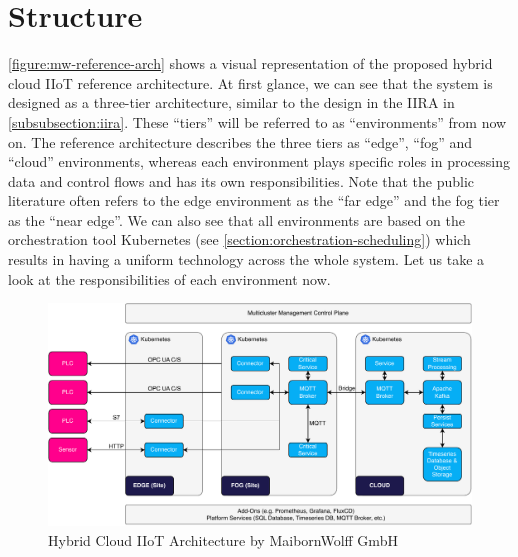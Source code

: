 \section{Structure}
\label{section:hybrid-cloud-structure}

    \autoref{figure:mw-reference-arch} shows a visual representation of the proposed hybrid cloud IIoT reference architecture. At first glance, we can see that the system is designed as a three-tier architecture, similar to the design in the IIRA in \autoref{subsubsection:iira}. These ``tiers'' will be referred to as ``environments'' from now on. The reference architecture describes the three tiers as ``edge'', ``fog'' and ``cloud'' environments, whereas each environment plays specific roles in processing data and control flows and has its own responsibilities. Note that the public literature often refers to the edge environment as the ``far edge'' and the fog tier as the ``near edge''. We can also see that all environments are based on the orchestration tool Kubernetes (see \autoref{section:orchestration-scheduling}) which results in having a uniform technology across the whole system. Let us take a look at the responsibilities of each environment now.

    
    \begin{figure}[htbp]
        \centering
        \includegraphics[width=\textwidth]{img/reference-architecture-bold.pdf}
        \caption{Hybrid Cloud IIoT Architecture by MaibornWolff GmbH \cite{building_iiot}}
        \label{figure:mw-reference-arch}
    \end{figure}

